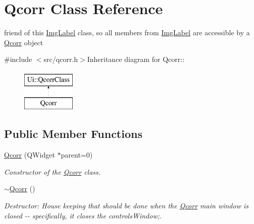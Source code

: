 \hypertarget{classQcorr}{
\section{Qcorr Class Reference}
\label{classQcorr}
}


friend of this \hyperlink{classImgLabel}{ImgLabel} class, so all members from \hyperlink{classImgLabel}{ImgLabel} are accessible by a \hyperlink{classQcorr}{Qcorr} object  


{\ttfamily \#include $<$src/qcorr.h$>$}Inheritance diagram for Qcorr::\begin{figure}[H]
\begin{center}
\leavevmode
\includegraphics[height=2cm]{classQcorr}
\end{center}
\end{figure}
\subsection*{Public Member Functions}
\begin{DoxyCompactItemize}
\item 
\hypertarget{classQcorr_a3b5d03aed21bfd00497ff265d898e45b}{
\hyperlink{classQcorr_a3b5d03aed21bfd00497ff265d898e45b}{Qcorr} (QWidget $\ast$parent=0)}
\label{classQcorr_a3b5d03aed21bfd00497ff265d898e45b}

\begin{DoxyCompactList}\small\item\em Constructor of the \hyperlink{classQcorr}{Qcorr} class. \item\end{DoxyCompactList}\item 
\hypertarget{classQcorr_ac228e26878cd0b63b162f1680ab4f4fd}{
\hyperlink{classQcorr_ac228e26878cd0b63b162f1680ab4f4fd}{$\sim$Qcorr} ()}
\label{classQcorr_ac228e26878cd0b63b162f1680ab4f4fd}

\begin{DoxyCompactList}\small\item\em Destructor: House keeping that should be done when the \hyperlink{classQcorr}{Qcorr} main window is closed -\/-\/ specifically, it closes the controlsWindow;. \item\end{DoxyCompactList}\end{DoxyCompactItemize}
